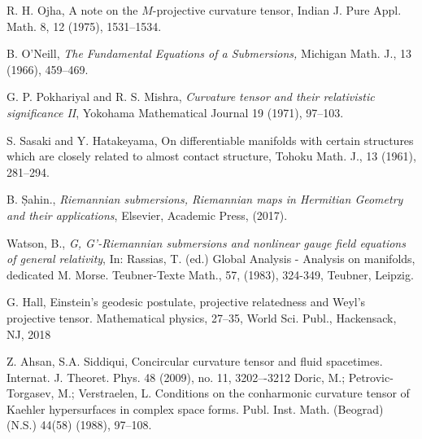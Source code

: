 \documentclass{birkjour}
\theoremstyle{definition}
\theoremstyle{remark}
\numberwithin{equation}{section}
\begin{document}
\begin{thebibliography}{99}
	 R. H. Ojha, A note on the $M$-projective curvature tensor,
	Indian J. Pure Appl. Math. 8, 12 (1975), 1531--1534.
	
	
	B. O'Neill, \emph{The Fundamental Equations of a Submersions,} Michigan Math. J., 13 (1966), 459--469.
	
	
	
	 G. P. Pokhariyal and R. S. Mishra, \emph{Curvature tensor and
		their relativistic significance II}, Yokohama Mathematical Journal 19 (1971),
	97--103.
	
	 S. Sasaki and Y. Hatakeyama, On differentiable manifolds
	with certain structures which are closely related to almost contact
	structure, Tohoku Math. J., 13 (1961), 281--294.
	
	 B. \d{S}ahin., {\it Riemannian submersions, Riemannian maps in Hermitian Geometry and their applications}, Elsevier, Academic Press, (2017).
	
	
	 Watson, B., {\it {G, G'-}Riemannian submersions and nonlinear
		gauge field equations of general relativity}, In: Rassias, T. (ed.) Global
	Analysis - Analysis on manifolds, dedicated M. Morse. Teubner-Texte Math.,
	57, (1983), 324-349, Teubner, Leipzig.
	
	
	
	 {G. Hall, Einstein's geodesic postulate, projective relatedness and Weyl's projective tensor.
	Mathematical physics, 27--35, World Sci. Publ., Hackensack, NJ, 2018} 

	 {Z. Ahsan, S.A. Siddiqui, Concircular curvature tensor and fluid spacetimes. Internat. J.
	Theoret. Phys. 48 (2009), no. 11, 3202–-3212}
	 {Doric, M.; Petrovic-Torgasev, M.; Verstraelen, L. Conditions on the conharmonic curvature
	tensor of Kaehler hypersurfaces in complex space forms. Publ. Inst. Math. (Beograd) (N.S.)
	44(58) (1988), 97--108.}
	
\end{thebibliography}
\end{document}
